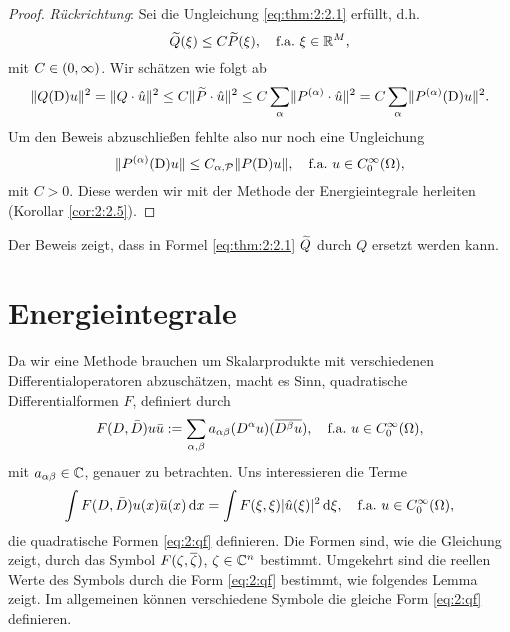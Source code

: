 \begin{proof}
{\em Rückrichtung}:
Sei die Ungleichung \eqref{eq:thm:2:2.1} erfüllt, d.h.
\begin{equation}\label{eq:2.10}
\widetilde{Q}(\xi)\leq C\widetilde{P}(\xi),
\quad\text{f.a.}~\xi\in\mathbb R^M,
\end{equation}
mit $C\in(0,\infty)$.
Wir schätzen wie folgt ab
\begin{equation}\label{eq:2.11}
\lVert Q(\mathrm D)u\rVert^2=\lVert Q\cdot\hat{u}\rVert^2\leq C\lVert\widetilde{P}\cdot\hat{u}\rVert^2
\leq C\sum_{\alpha}\lVert P^{(\alpha)}\cdot\hat{u}\rVert^2=C\sum_\alpha\lVert P^{(\alpha)}(\mathrm D)u\rVert^2.
\end{equation}
Um den Beweis abzuschließen fehlte also nur noch eine Ungleichung
\begin{equation}
\lVert P^{(\alpha)}(\mathrm D)u\rVert\leq C_{\alpha,\mathcal P}\lVert P(\mathrm D)u\rVert,
\quad\text{f.a.}~u\in C^\infty_0(\Omega),
\end{equation}
mit $C>0$.
Diese werden wir mit der Methode der Energieintegrale herleiten (Korollar \ref{cor:2:2.5}).
\end{proof}

Der Beweis zeigt,
dass in Formel \eqref{eq:thm:2:2.1} $\widetilde{Q}$ durch $Q$ ersetzt werden kann.

\section{Energieintegrale}

Da wir eine Methode brauchen um Skalarprodukte
mit verschiedenen Differentialoperatoren abzuschätzen,
macht es Sinn, quadratische Differentialformen $F$, definiert durch
\begin{equation}
F(D,\bar{D})u\bar{u}:=\sum_{\alpha,\beta}a_{\alpha\beta}(D^\alpha u)(\overline{D^\beta u}),
\quad\text{f.a.}~u\in C^\infty_0(\Omega),
\end{equation}
mit $a_{\alpha\beta}\in\mathbb C$, genauer zu betrachten.
Uns interessieren die Terme
\begin{equation}\label{eq:2:qf}
\int F(D,\bar{D})u(x)\bar{u}(x)\,\mathrm d x=\int F(\xi,\xi)\lvert\hat{u}(\xi)\rvert^2\,\mathrm d \xi,
\quad\text{f.a.}~u\in C^\infty_0(\Omega),
\end{equation}
die quadratische Formen \eqref{eq:2:qf} definieren.
Die Formen sind, wie die Gleichung zeigt,
durch das Symbol $F(\zeta,\overline{\zeta})$, $\zeta\in\mathbb C^n$ bestimmt.
Umgekehrt sind die reellen Werte des Symbols
durch die Form \eqref{eq:2:qf} bestimmt,
wie folgendes Lemma zeigt.
Im allgemeinen können verschiedene Symbole
die gleiche Form \eqref{eq:2:qf} definieren.

